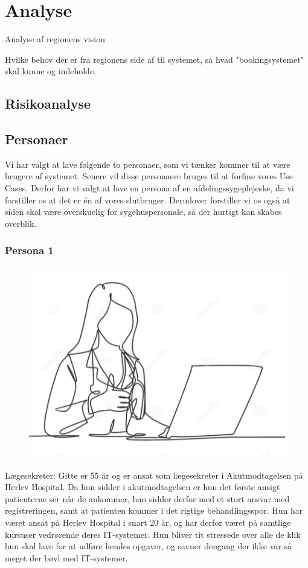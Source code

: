 \section{Analyse}
Analyse af regionens vision

Hvilke behov der er fra regionens side af til systemet, så hvad "bookingsystemet" skal kunne og indeholde.

\subsection{Risikoanalyse}



\subsection{Personaer}
Vi har valgt at lave følgende to personaer, som vi tænker kommer til at være brugere af systemet. 
Senere vil disse personaere bruges til at forfine vores Use Cases. Derfor har vi valgt at lave en persona af en afdelingssygeplejeske, da vi forstiller os at det er én af vores slutbruger. Derudover forstiller vi os også at siden skal være overskuelig for sygehuspersonale, så der hurtigt kan skabes overblik. 


\subsubsection{Persona 1}
\begin{figure}
\includegraphics[width=0.9\linewidth]{Billeder/IT SPL.png} 
\end{figure}
Lægesekreter:
Gitte er 55 år og er ansat som lægesekreter i Akutmodtagelsen på Herlev Hospital. Da hun sidder i akutmodtagelsen er hun det første ansigt patienterne ser når de ankommer, hun sidder derfor med et stort ansvar med registreringen, samt at patienten kommer i det rigtige behandlingsspor. Hun har været ansat på Herlev Hospital i snart 20 år, og har derfor været på samtlige kursuser vedrørende deres IT-systemer. Hun bliver tit stressede over alle de klik hun skal lave for at udføre hendes opgaver, og savner dengang der ikke var så meget der bøvl med IT-systemer. 

